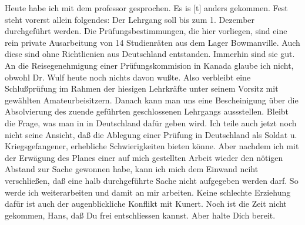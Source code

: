 \def\day{28. Juni 1944.}
\mktitle

Heute habe ich  mit dem professor gesprochen.
Es is{\color{red} [t] } anders gekommen.
Fest steht vorerst allein folgendes: Der Lehrgang soll bis zum 1. Dezember durchgef\"{u}hrt werden.
Die Pr\"{u}fungsbestimmungen, die hier vorliegen, sind eine rein private Ausarbeitung von 14 Studienr\"{a}ten aus dem Lager Bowmanville.
Auch diese sind ohne Richtlienien aus Deutschland entstanden.
Immerhin sind sie gut.
An die Reisegenehmigung einer Pr\"{u}fungskommision in Kanada glaube ich nicht, obwohl Dr. Wulf heute noch nichts davon wu{\ss}te.
Also verbleibt eine Schlu{\ss}pr\"{u}fung im Rahmen der hiesigen Lehrkr\"{a}fte unter seinem Vorsitz mit gew\"{a}hlten Amateurbeisitzern.
Danach kann man uns eine Bescheinigung \"{u}ber die Absolvierung des zuende gef\"{u}hrten geschlossenen Lehrgangs aussstellen.
Bleibt die Frage, was man in in Deutschland daf\"{u}r geben wird.
Ich teile auch jetzt noch nicht seine Ansicht, da{\ss} die Ablegung einer Pr\"{u}fung in Deutschland als Soldat u. Kriegsgefangener, erhebliche Schwierigkeiten bieten k\"{o}nne.
Aber nachdem ich mit der Erw\"{a}gung des Planes einer auf mich gestellten Arbeit wieder den n\"{o}tigen Abstand zur Sache gewonnen habe, kann ich mich dem Einwand nciht verschlie{\ss}en, da{\ss} eine halb durchgef\"{u}hrte Sache nicht aufgegeben werden darf.
So werde ich weiterarbeiten und damit an mir arbeiten.
Keine schlechte Erziehung daf\"{u}r ist auch der augenblickliche Konflikt mit Kunert.
Noch ist die Zeit nicht gekommen, Hans, da{\ss} Du frei entschliessen kannst.
Aber halte Dich bereit.

\clearpage
